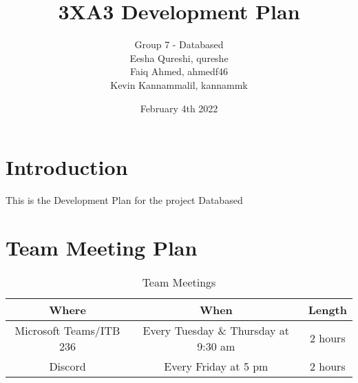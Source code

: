 \documentclass[12pt,letterpaper]{article}
\title{3XA3 Development Plan}
\author{Group 7 - Databased \\ Eesha Qureshi, qureshe \\ Faiq Ahmed, ahmedf46 \\ Kevin Kannammalil, kannammk}
\date{February 4th 2022}
\begin{document}
\maketitle



\newpage
\tableofcontents

\newpage
\section{Introduction}

This is the Development Plan for the project Databased

\section{Team Meeting Plan}
\begin{table}[H]
    \centering
    \begin{tabular}{ |c|c|c| } 
    \hline
    Where & When & Length \\
    \hline
    Microsoft Teams/ITB 236 & Every Tuesday \& Thursday at 9:30 am & 2 hours \\
    Discord & Every Friday at 5 pm & 2 hours \\
    \hline
    \end{tabular}
    \caption{Team Meetings}
    \label{tab:teammeetings}
\end{table}
\end{document}
